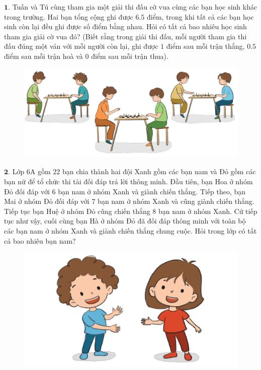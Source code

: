 \begin{multicols}{2}
	$\pmb{1.}$ Tuấn và Tú cùng tham gia một giải thi đấu cờ vua cùng các bạn học sinh khác trong trường. Hai bạn tổng cộng ghi được $6{.}5$ điểm, trong khi tất cả các bạn học sinh còn lại đều ghi được số điểm bằng nhau. Hỏi có tất cả bao nhiêu học sinh tham gia giải cờ vua đó? (Biết rằng trong giải thi đấu, mỗi người tham gia thi đấu đúng một ván với mỗi người còn lại, ghi được $1$ điểm sau mỗi trận thắng, $0{.}5$ điểm sau mỗi trận hoà và $0$ điểm sau mỗi trận thua).
	\begin{figure}[H]
		\centering
		\vspace*{-5pt}
		\captionsetup{labelformat= empty, justification=centering}
		\includegraphics[width=1\linewidth]{Hinh1}
		\vspace*{-20pt}
	\end{figure}
	$\pmb{2.}$ 	Lớp $6$A gồm $22$ bạn chia thành hai đội Xanh gồm các bạn nam và Đỏ gồm các bạn nữ để tổ chức thi tài đối đáp trả lời thông minh. Đầu tiên, bạn Hoa ở nhóm Đỏ đối đáp với $6$ bạn nam ở nhóm Xanh và giành chiến thắng. Tiếp theo, bạn Mai ở nhóm Đỏ đối đáp với $7$ bạn nam ở nhóm Xanh và cũng giành chiến thắng. Tiếp tục bạn Huệ ở nhóm Đỏ cũng chiến thắng $8$ bạn nam ở nhóm Xanh. Cứ tiếp tục như vậy, cuối cùng bạn Hà ở nhóm Đỏ đã đối đáp thông minh với toàn bộ các bạn nam ở nhóm Xanh và giành chiến thắng chung cuộc. Hỏi trong lớp có tất cả bao nhiêu bạn nam?
	\begin{figure}[H]
		\centering
		\vspace*{-5pt}
		\captionsetup{labelformat= empty, justification=centering}
		\includegraphics[width=1.01\linewidth]{Hinh2}

\end{figure}
\end{multicols}
